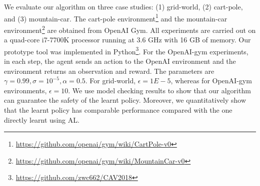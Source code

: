 We evaluate our algorithm on three case studies: (1) grid-world, (2) cart-pole, and (3) mountain-car. The cart-pole environment\footnote{\url{https://github.com/openai/gym/wiki/CartPole-v0}} and the mountain-car environment\footnote{\url{https://github.com/openai/gym/wiki/MountainCar-v0}} are obtained from OpenAI Gym. All experiments are carried out on a quad-core i7-7700K processor running at 3.6 GHz with 16 GB of memory. 
Our prototype tool was implemented in Python\footnote{\url{https://github.com/zwc662/CAV2018}}.
For the OpenAI-gym experiments, in each step, the agent sends an action to the OpenAI environment and the environment returns an observation and reward. 
The parameters are $\gamma=0.99, \sigma=10^{-5}, \alpha=0.5$. For grid-world, $\epsilon=1E-5$, whereas for OpenAI-gym environments, $\epsilon=10$.
We use model checking results to show that our algorithm can guarantee the safety of the learnt policy. Moreover, we quantitatively show that the learnt policy has comparable performance compared with the one directly learnt using AL.
